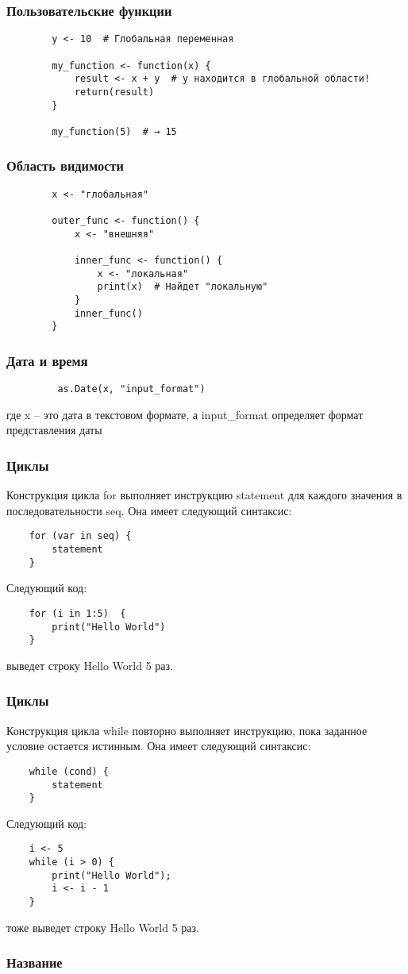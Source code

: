\documentclass{beamer}
\begin{document}
\begin{frame}[fragile]
		\frametitle{Пользовательские функции}
		\begin{verbatim}
		y <- 10  # Глобальная переменная
		
		my_function <- function(x) {
			result <- x + y  # y находится в глобальной области!
			return(result)
		}
		
		my_function(5)  # → 15
		\end{verbatim}
\end{frame}

\begin{frame}[fragile]
	\frametitle{Область видимости}
	\begin{verbatim}
		x <- "глобальная"
		
		outer_func <- function() {
			x <- "внешняя"
			
			inner_func <- function() {
				x <- "локальная"
				print(x)  # Найдет "локальную"
			}
			inner_func()
		}
	\end{verbatim}
\end{frame}

\begin{frame}[fragile]
	\frametitle{Дата и время}
	\begin{verbatim}
	     as.Date(x, "input_format")
    \end{verbatim} 	
	где x – это дата в текстовом формате, а input\_format определяет формат представления даты
\end{frame}

\begin{frame}[fragile]
	\frametitle{Циклы}
	Конструкция цикла for выполняет инструкцию statement для каждого значения в последовательности seq. Она имеет следующий синтаксис:
	\begin{verbatim}
	for (var in seq) {
	    statement
	}
    \end{verbatim}
	Следующий код:
	\begin{verbatim}
	for (i in 1:5)  {
	    print("Hello World")
	}
\end{verbatim}
	выведет строку Hello World 5 раз.
\end{frame}

\begin{frame}[fragile]
	\frametitle{Циклы}
	Конструкция цикла while повторно выполняет инструкцию, пока заданное условие остается истинным. Она имеет следующий синтаксис:
	\begin{verbatim}
	while (cond) {
		statement
	}
    \end{verbatim}
	Следующий код:
\begin{verbatim}	
	i <- 5
	while (i > 0) {
		print("Hello World"); 
		i <- i - 1
	}
\end{verbatim}	
	тоже выведет строку Hello World 5 раз.
\end{frame}



\begin{frame}
	\frametitle{Название}
\end{frame}
\end{document}
